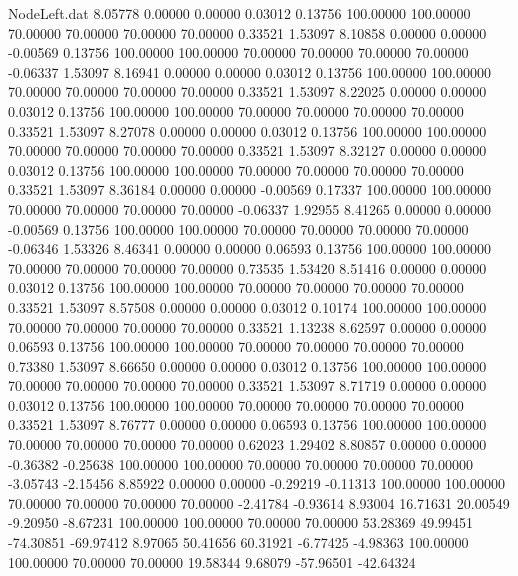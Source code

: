 \begin{filecontents}{NodeLeft.dat}
   8.05778    0.00000    0.00000     0.03012    0.13756  100.00000  100.00000   70.00000   70.00000   70.00000   70.00000    0.33521    1.53097
   8.10858    0.00000    0.00000    -0.00569    0.13756  100.00000  100.00000   70.00000   70.00000   70.00000   70.00000   -0.06337    1.53097
   8.16941    0.00000    0.00000     0.03012    0.13756  100.00000  100.00000   70.00000   70.00000   70.00000   70.00000    0.33521    1.53097
   8.22025    0.00000    0.00000     0.03012    0.13756  100.00000  100.00000   70.00000   70.00000   70.00000   70.00000    0.33521    1.53097
   8.27078    0.00000    0.00000     0.03012    0.13756  100.00000  100.00000   70.00000   70.00000   70.00000   70.00000    0.33521    1.53097
   8.32127    0.00000    0.00000     0.03012    0.13756  100.00000  100.00000   70.00000   70.00000   70.00000   70.00000    0.33521    1.53097
   8.36184    0.00000    0.00000    -0.00569    0.17337  100.00000  100.00000   70.00000   70.00000   70.00000   70.00000   -0.06337    1.92955
   8.41265    0.00000    0.00000    -0.00569    0.13756  100.00000  100.00000   70.00000   70.00000   70.00000   70.00000   -0.06346    1.53326
   8.46341    0.00000    0.00000     0.06593    0.13756  100.00000  100.00000   70.00000   70.00000   70.00000   70.00000    0.73535    1.53420
   8.51416    0.00000    0.00000     0.03012    0.13756  100.00000  100.00000   70.00000   70.00000   70.00000   70.00000    0.33521    1.53097
   8.57508    0.00000    0.00000     0.03012    0.10174  100.00000  100.00000   70.00000   70.00000   70.00000   70.00000    0.33521    1.13238
   8.62597    0.00000    0.00000     0.06593    0.13756  100.00000  100.00000   70.00000   70.00000   70.00000   70.00000    0.73380    1.53097
   8.66650    0.00000    0.00000     0.03012    0.13756  100.00000  100.00000   70.00000   70.00000   70.00000   70.00000    0.33521    1.53097
   8.71719    0.00000    0.00000     0.03012    0.13756  100.00000  100.00000   70.00000   70.00000   70.00000   70.00000    0.33521    1.53097
   8.76777    0.00000    0.00000     0.06593    0.13756  100.00000  100.00000   70.00000   70.00000   70.00000   70.00000    0.62023    1.29402
   8.80857    0.00000    0.00000    -0.36382   -0.25638  100.00000  100.00000   70.00000   70.00000   70.00000   70.00000   -3.05743   -2.15456
   8.85922    0.00000    0.00000    -0.29219   -0.11313  100.00000  100.00000   70.00000   70.00000   70.00000   70.00000   -2.41784   -0.93614
   8.93004   16.71631   20.00549    -9.20950   -8.67231  100.00000  100.00000   70.00000   70.00000   53.28369   49.99451  -74.30851  -69.97412
   8.97065   50.41656   60.31921    -6.77425   -4.98363  100.00000  100.00000   70.00000   70.00000   19.58344    9.68079  -57.96501  -42.64324

\end{filecontents}
